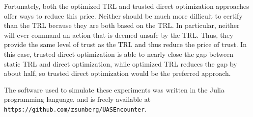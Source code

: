 Fortunately, both the optimized TRL and trusted direct optimization approaches offer ways to reduce this price.
Neither should be much more difficult to certify than the TRL because they are both based on the TRL.
In particular, neither will ever command an action that is deemed unsafe by the TRL. 
Thus, they provide the same level of trust as the TRL and thus reduce the price of trust.
In this case, trusted direct optimization is able to nearly close the gap between static TRL and direct optimization, while optimized TRL reduces the gap by about half, so trusted direct optimization would be the preferred approach.


The software used to simulate these experiments was written in the Julia programming language, and is freely available at \texttt{\small{https://github.com/zsunberg/UASEncounter}}.


